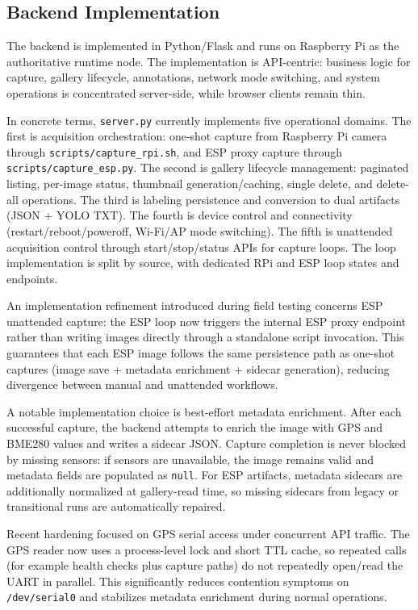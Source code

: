\subsection{Backend Implementation}
The backend is implemented in Python/Flask and runs on Raspberry Pi as the authoritative runtime node. The implementation is API-centric: business logic for capture, gallery lifecycle, annotations, network mode switching, and system operations is concentrated server-side, while browser clients remain thin.

In concrete terms, \texttt{server.py} currently implements five operational domains. The first is acquisition orchestration: one-shot capture from Raspberry Pi camera through \texttt{scripts/capture\_rpi.sh}, and ESP proxy capture through \texttt{scripts/capture\_esp.py}. The second is gallery lifecycle management: paginated listing, per-image status, thumbnail generation/caching, single delete, and delete-all operations. The third is labeling persistence and conversion to dual artifacts (JSON + YOLO TXT). The fourth is device control and connectivity (restart/reboot/poweroff, Wi-Fi/AP mode switching). The fifth is unattended acquisition control through start/stop/status APIs for capture loops. The loop implementation is split by source, with dedicated RPi and ESP loop states and endpoints.

An implementation refinement introduced during field testing concerns ESP unattended capture: the ESP loop now triggers the internal ESP proxy endpoint rather than writing images directly through a standalone script invocation. This guarantees that each ESP image follows the same persistence path as one-shot captures (image save + metadata enrichment + sidecar generation), reducing divergence between manual and unattended workflows.

A notable implementation choice is best-effort metadata enrichment. After each successful capture, the backend attempts to enrich the image with GPS and BME280 values and writes a sidecar JSON. Capture completion is never blocked by missing sensors: if sensors are unavailable, the image remains valid and metadata fields are populated as \texttt{null}. For ESP artifacts, metadata sidecars are additionally normalized at gallery-read time, so missing sidecars from legacy or transitional runs are automatically repaired.

Recent hardening focused on GPS serial access under concurrent API traffic. The GPS reader now uses a process-level lock and short TTL cache, so repeated calls (for example health checks plus capture paths) do not repeatedly open/read the UART in parallel. This significantly reduces contention symptoms on \texttt{/dev/serial0} and stabilizes metadata enrichment during normal operations.

